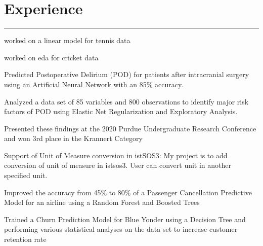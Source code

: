 \documentclass[]{sahana}
\begin{document}
\hfill
\begin{minipage}[t]{0.66\textwidth} 
\vspace{-1pt}
\section{Experience}
\noindent\rule{12.5cm}{0.4pt}
\vspace{-4pt}
\noindent
\begin{tightemize}
\item worked on a linear model for tennis data
\item worked on eda for cricket data
\end{tightemize}
\sectionsep

\vspace{-4pt}
\noindent
\begin{tightemize}
\vspace{-5pt}
\item Predicted Postoperative Delirium (POD) for patients after intracranial surgery using an Artificial Neural Network with an 85\% accuracy.
\item Analyzed a data set of 85 variables and 800 observations to identify major risk factors of POD using Elastic Net Regularization and Exploratory Analysis.
\item Presented these findings at the 2020 Purdue Undergraduate Research Conference and won 3rd place in the Krannert Category
\end{tightemize}
\sectionsep

\vspace{-4pt}
\noindent
Support of Unit of Measure conversion in istSOS3: My project is to add conversion of
unit of measure in istsos3. User can convert unit in another specified unit.\\
\sectionsep

\vspace{-4pt}
\noindent
\begin{tightemize}
\vspace{-6pt}
\item Improved the accuracy from 45\% to 80\% of a Passenger Cancellation Predictive Model for an airline using a Random Forest and Boosted Trees 
\item Trained a Churn Prediction Model for Blue Yonder using a Decision Tree and performing various statistical analyses on the data set to increase customer retention rate
\end{tightemize}
\sectionsep


\end{minipage}
\end{document}
